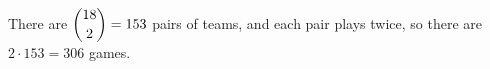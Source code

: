 There are $\dbinom{18}2=153$ pairs of teams, and each pair plays twice, so there are $2\cdot153=\boxed{306}$ games.
